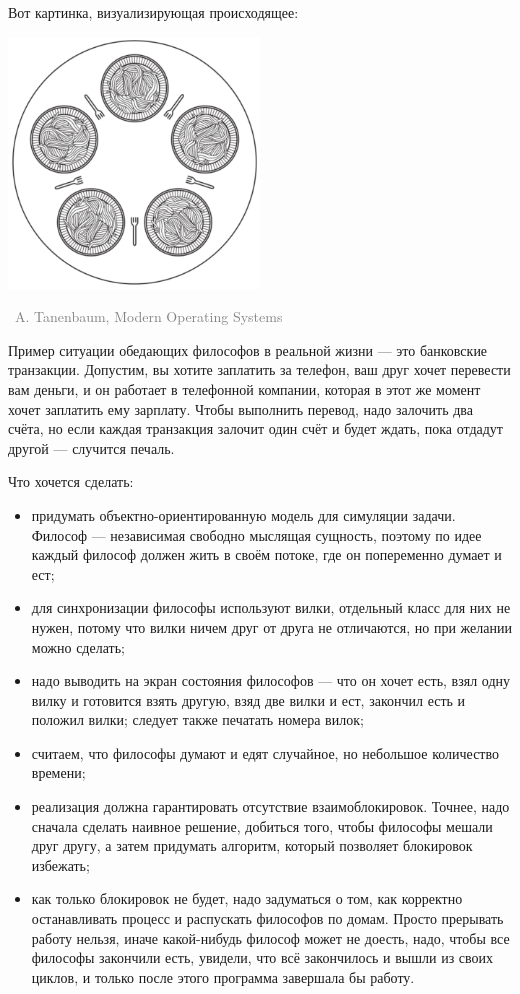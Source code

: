 \documentclass[a5paper]{article}
\newcommand{\attribution}[1] {
\vspace{-2mm}\begin{flushright}\begin{scriptsize}\textcolor{gray}{\textcopyright\, #1}\end{scriptsize}\end{flushright}
}
\begin{document}
Вот картинка, визуализирующая происходящее:

\begin{center}
    \includegraphics[width=0.5\textwidth]{diningPhilosophers.png}
    \attribution{A. Tanenbaum, Modern Operating Systems}
\end{center}

Пример ситуации обедающих философов в реальной жизни --- это банковские транзакции. Допустим, вы хотите заплатить за телефон, ваш друг хочет перевести вам деньги, и он работает в телефонной компании, которая в этот же момент хочет заплатить ему зарплату. Чтобы выполнить перевод, надо залочить два счёта, но если каждая транзакция залочит один счёт и будет ждать, пока отдадут другой --- случится печаль.

Что хочется сделать:

\begin{itemize}
    \item придумать объектно-ориентированную модель для симуляции задачи. Философ --- независимая свободно мыслящая сущность, поэтому по идее каждый философ должен жить в своём потоке, где он попеременно думает и ест;
    \item для синхронизации философы используют вилки, отдельный класс для них не нужен, потому что вилки ничем друг от друга не отличаются, но при желании можно сделать;
    \item надо выводить на экран состояния философов --- что он хочет есть, взял одну вилку и готовится взять другую, взяд две вилки и ест, закончил есть и положил вилки; следует также печатать номера вилок;
    \item считаем, что философы думают и едят случайное, но небольшое количество времени;
    \item реализация должна гарантировать отсутствие взаимоблокировок. Точнее, надо сначала сделать наивное решение, добиться того, чтобы философы мешали друг другу, а затем придумать алгоритм, который позволяет блокировок избежать;
    \item как только блокировок не будет, надо задуматься о том, как корректно останавливать процесс и распускать философов по домам. Просто прерывать работу нельзя, иначе какой-нибудь философ может не доесть, надо, чтобы все философы закончили есть, увидели, что всё закончилось и вышли из своих циклов, и только после этого программа завершала бы работу.
\end{itemize}
\end{document}
